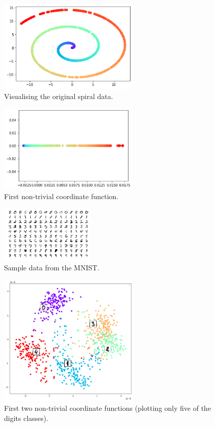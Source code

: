 \begin{figure}[H]
        \includegraphics[width=0.6\textwidth]{presentation/spiral.png}
        \caption{Visualising the original spiral data.}
    \end{figure} 
  \begin{figure}[H]         \includegraphics[width=0.6\textwidth]{presentation/spiral-unroll.png}
        \caption{First non-trivial coordinate function.}
        \end{figure} 
\begin{figure}[H]
        \includegraphics[width=0.4\textwidth]{presentation/mnist-vis.png}
        \caption{Sample data from the MNIST.}
    \end{figure} 
  \begin{figure}[H]
            \includegraphics[width=0.6\textwidth]{presentation/mnist.png}
        \caption{First two non-trivial coordinate functions (plotting only five of the digits classes).}    
        \end{figure} 
        

